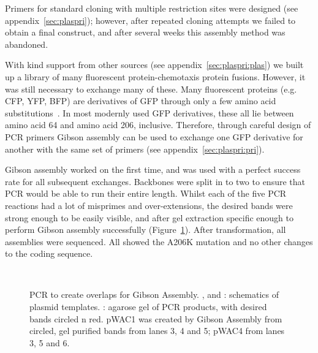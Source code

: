 \documentclass[../main.tex]{subfiles}
\begin{document}
Primers for standard cloning with multiple restriction sites were designed (see appendix~\ref{sec:plaspri}); however, after repeated cloning attempts we failed to obtain a final construct, and after several weeks this assembly method was abandoned.

With kind support from other sources (see appendix~\ref{sec:plaspri:plas}) we built up a library of many fluorescent protein-chemotaxis protein fusions. However, it was still necessary to exchange many of these. Many fluorescent proteins (e.g. CFP, YFP, BFP) are derivatives of GFP through only a few amino acid substitutions~\citep{tsien98}. In most modernly used GFP derivatives, these all lie between amino acid 64 and amino acid 206, inclusive. Therefore, through careful design of PCR primers Gibson assembly can be used to exchange one GFP derivative for another with the same set of primers (see appendix~\ref{sec:plaspri:pri}).

Gibson assembly worked on the first time, and was used with a perfect success rate for all subsequent exchanges. Backbones were split in to two to ensure that PCR would be able to run their entire length. Whilst each of the five PCR reactions had a lot of misprimes and over-extensions, the desired bands were strong enough to be easily visible, and after gel extraction specific enough to perform Gibson assembly successfully (Figure~\ref{fig:results:gibson}). After transformation, all assemblies were sequenced. All showed the A206K mutation and no other changes to the coding sequence.

\begin{figure}
\begin{center}
\\
\caption[PCR results for Gibson Assembly]{PCR to create overlaps for Gibson Assembly. ,  and : schematics of plasmid templates. : agarose gel of PCR products, with desired bands circled n red. pWAC1 was created by Gibson Assembly from circled, gel purified bands from lanes 3, 4 and 5; pWAC4 from lanes 3, 5 and 6.}
\label{fig:results:gibson}
\end{center}
\end{figure}
\newpage
\end{document}
